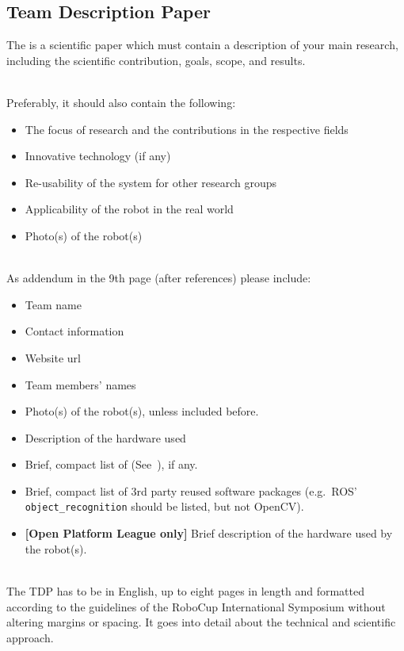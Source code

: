 \subsection{Team Description Paper}
\label{rule:website_tdp}
The  is a scientific paper which must contain a description of your main research, including the scientific contribution, goals, scope, and results.

~\\\noindent Preferably, it should also contain the following:
\begin{itemize}
	\item The focus of research and the contributions in the respective fields
	\item Innovative technology (if any)
	\item Re-usability of the system for other research groups
	\item Applicability of the robot in the real world
	\item Photo(s) of the robot(s)
\end{itemize}

~\\\noindent As addendum in the 9th page (after references) please include:
\begin{itemize}
	\item Team name
	\item Contact information
	\item Website url
	\item Team members' names
	\item Photo(s) of the robot(s), unless included before.
	\item Description of the hardware used
	\item Brief, compact list of  (See~), if any.
	\item Brief, compact list of 3rd party reused software packages (e.g.~ROS' \texttt{object\_recognition} should be listed, but not OpenCV).
	\item \textbf{[Open Platform League only]} Brief description of the hardware used by the robot(s).
\end{itemize}

~\\\noindent The TDP has to be in English, up to eight pages in length and formatted according to the guidelines of the RoboCup International Symposium without altering margins or spacing. It goes into detail about the technical and scientific approach.

